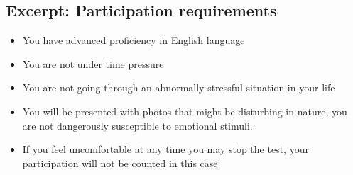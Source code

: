 
\begin{listing}[ht!]

\section{Excerpt: Participation requirements}
\label{itm:participation_requirements}

\begin{itemize}
	\item You have advanced proficiency in English language
	\item You are not under time pressure
	\item You are not going through an abnormally stressful situation in
	your life
	\item You will be presented with photos that might be disturbing in
	nature, you are not dangerously susceptible to emotional stimuli.
	\item If you feel uncomfortable at any time you may stop the test, your
	participation will not be counted in this case
\end{itemize}
\end{listing}


